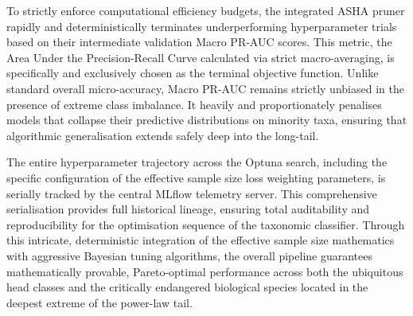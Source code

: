 To strictly enforce computational efficiency budgets, the integrated ASHA pruner rapidly and deterministically terminates underperforming hyperparameter trials based on their intermediate validation Macro PR-AUC scores. This metric, the Area Under the Precision-Recall Curve calculated via strict macro-averaging, is specifically and exclusively chosen as the terminal objective function. Unlike standard overall micro-accuracy, Macro PR-AUC remains strictly unbiased in the presence of extreme class imbalance. It heavily and proportionately penalises models that collapse their predictive distributions on minority taxa, ensuring that algorithmic generalisation extends safely deep into the long-tail.

The entire hyperparameter trajectory across the Optuna search, including the specific configuration of the effective sample size loss weighting parameters, is serially tracked by the central MLflow telemetry server. This comprehensive serialisation provides full historical lineage, ensuring total auditability and reproducibility for the optimisation sequence of the taxonomic classifier. Through this intricate, deterministic integration of the effective sample size mathematics with aggressive Bayesian tuning algorithms, the overall pipeline guarantees mathematically provable, Pareto-optimal performance across both the ubiquitous head classes and the critically endangered biological species located in the deepest extreme of the power-law tail.
